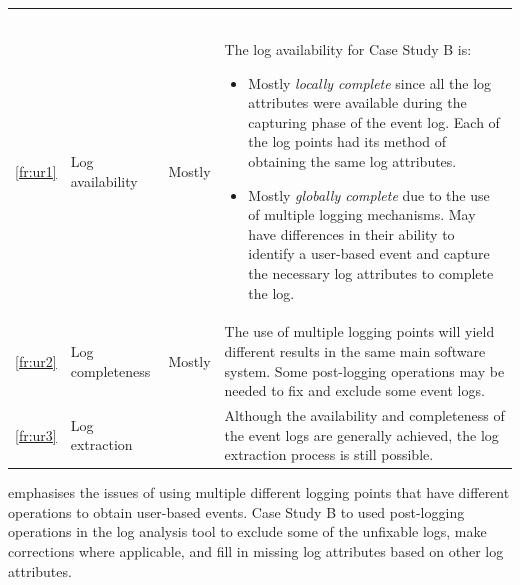 \begin{xltabular}{\textwidth}{clcX}
	\caption[Logging quality assessment of Case Study B]{\textit{Logging quality assessment of Case Study B}}\label{tbl:ch3_caseBQuality}\\
	\toprule
	 &  &  &  \\
	\midrule
	\endfirsthead

	\caption[]{\continueCaption} \\
	\toprule
	 &  &  &  \\
	\midrule
	\endhead

	\midrule
	 \\
	\endfoot
	\endlastfoot

	\ref{fr:ur1} & Log availability & Mostly & \RaggedRight The log availability for Case Study B is:
		\begin{itemize}
			\item Mostly \textit{locally complete} since all the log attributes were available during the capturing phase of the event log. Each of the log points had its method of obtaining the same log attributes.
			\item Mostly \textit{globally complete} due to the use of multiple logging mechanisms. May have differences in their ability to identify a user-based event and capture the necessary log attributes to complete the log. 
		\end{itemize} \\
	\ref{fr:ur2} & Log completeness & Mostly & The use of multiple logging points will yield different results in the same main software system. Some post-logging operations may be needed to fix and exclude some event logs. \\
	\ref{fr:ur3} & Log extraction & \cmark & Although the availability and completeness of the event logs are generally achieved, the log extraction process is still possible.   \\
	\bottomrule
\end{xltabular}

 emphasises the issues of using multiple different logging points that have different operations to obtain user-based events. Case Study B to used post-logging operations in the log analysis tool to exclude some of the unfixable logs, make corrections where applicable, and fill in missing log attributes based on other log attributes.

